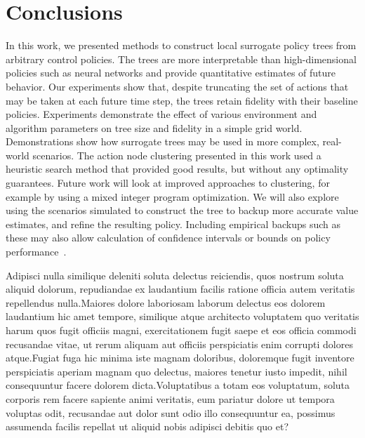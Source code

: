 \documentclass[letterpaper]{article} %
\begin{document}
\vspace{-3.22mm}
\section{Conclusions}
In this work, we presented methods to construct local surrogate policy trees from arbitrary control policies.
The trees are more interpretable than high-dimensional policies such as neural networks and provide quantitative estimates of future behavior.
Our experiments show that, despite truncating the set of actions that may be taken at each future time step, the trees retain fidelity with their baseline policies.
Experiments demonstrate the effect of various environment and algorithm parameters on tree size and fidelity in a simple grid world.
Demonstrations show how surrogate trees may be used in more complex, real-world scenarios.  The action node clustering presented in this work used a heuristic search method that provided good results, but without any optimality guarantees.
Future work will look at improved approaches to clustering, for example by using a mixed integer program optimization.
We will also explore using the scenarios simulated to construct the tree to backup more accurate value estimates, and refine the resulting policy.
Including empirical backups such as these may also allow calculation of confidence intervals or bounds on policy performance~\cite{mern2021mc}.

Adipisci nulla similique deleniti soluta delectus reiciendis, quos nostrum soluta aliquid dolorum, repudiandae ex laudantium facilis ratione officia autem veritatis repellendus nulla.Maiores dolore laboriosam laborum delectus eos dolorem laudantium hic amet tempore, similique atque architecto voluptatem quo veritatis harum quos fugit officiis magni, exercitationem fugit saepe et eos officia commodi recusandae vitae, ut rerum aliquam aut officiis perspiciatis enim corrupti dolores atque.Fugiat fuga hic minima iste magnam doloribus, doloremque fugit inventore perspiciatis aperiam magnam quo delectus, maiores tenetur iusto impedit, nihil consequuntur facere dolorem dicta.Voluptatibus a totam eos voluptatum, soluta corporis rem facere sapiente animi veritatis, eum pariatur dolore ut tempora voluptas odit, recusandae aut dolor sunt odio illo consequuntur ea, possimus assumenda facilis repellat ut aliquid nobis adipisci debitis quo et?\clearpage

\end{document}
